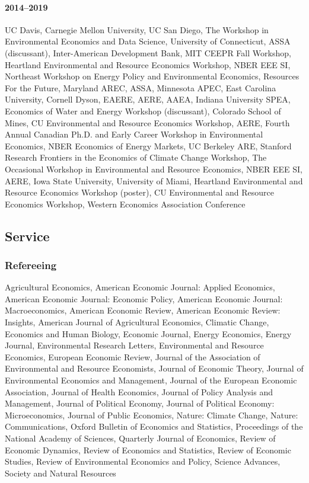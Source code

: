 \documentclass[12pt]{res} %
\begin{document}
\begin{resume}
\paragraph{2014--2019} UC Davis, Carnegie Mellon University, UC San Diego, The Workshop in Environmental Economics and Data Science, University of Connecticut, ASSA (discussant), Inter-American Development Bank, MIT CEEPR Fall Workshop, Heartland Environmental and Resource Economics Workshop, NBER EEE SI, Northeast Workshop on Energy Policy and Environmental Economics, Resources For the Future, Maryland AREC, ASSA, Minnesota APEC, East Carolina University, Cornell Dyson, EAERE, AERE, AAEA, Indiana University SPEA, Economics of Water and Energy Workshop (discussant), Colorado School of Mines, CU Environmental and Resource Economics Workshop, AERE, Fourth Annual Canadian Ph.D. and Early Career Workshop in Environmental Economics, NBER Economics of Energy Markets, UC Berkeley ARE, Stanford Research Frontiers in the Economics of Climate Change Workshop, The Occasional Workshop in Environmental and Resource Economics, NBER EEE SI, AERE, Iowa State University, University of Miami, Heartland Environmental and Resource Economics Workshop (poster), CU Environmental and Resource Economics Workshop, Western Economics Association Conference

\vspace{-.2in}

\subsection{Service}\vspace{-.2in}
\subsubsection{Refereeing}\vspace{-.2in}
	Agricultural Economics,
	American Economic Journal: Applied Economics,
	American Economic Journal: Economic Policy,
	American Economic Journal: Macroeconomics,
	American Economic Review,
	American Economic Review: Insights,
	American Journal of Agricultural Economics,
	Climatic Change,
	Economics and Human Biology,
	Economic Journal,
	Energy Economics,
	Energy Journal,
	Environmental Research Letters,
	Environmental and Resource Economics,
	European Economic Review,
	Journal of the Association of Environmental and Resource Economists,
	Journal of Economic Theory,
	Journal of Environmental Economics and Management,
	Journal of the European Economic Association,
	Journal of Health Economics,
	Journal of Policy Analysis and Management,
	Journal of Political Economy,
	Journal of Political Economy: Microeconomics,
	Journal of Public Economics,
	Nature: Climate Change,
	Nature: Communications,
	Oxford Bulletin of Economics and Statistics,
	Proceedings of the National Academy of Sciences,
	Quarterly Journal of Economics,
	Review of Economic Dynamics,
	Review of Economics and Statistics,
	Review of Economic Studies,
	Review of Environmental Economics and Policy,
	Science Advances,
	Society and Natural Resources


\end{resume}
\end{document}
